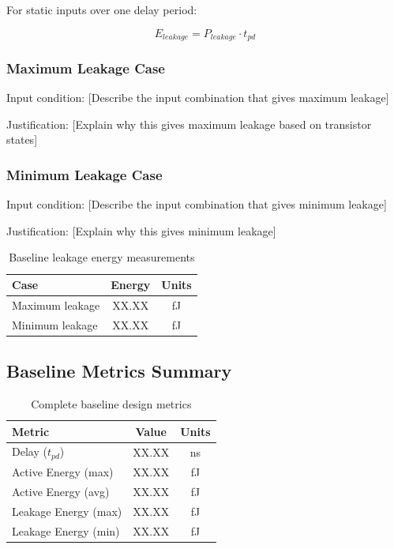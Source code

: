 \documentclass[12pt,letterpaper]{article}
\begin{document}
For static inputs over one delay period:

\begin{equation}
E_{leakage} = P_{leakage} \cdot t_{pd}
\end{equation}

\subsubsection{Maximum Leakage Case}

Input condition: [Describe the input combination that gives maximum leakage]

Justification: [Explain why this gives maximum leakage based on transistor states]

\subsubsection{Minimum Leakage Case}

Input condition: [Describe the input combination that gives minimum leakage]

Justification: [Explain why this gives minimum leakage]

\begin{table}[H]
\centering
\caption{Baseline leakage energy measurements}
\label{tab:baseline_leakage}
\begin{tabular}{@{}lcc@{}}
\toprule
\textbf{Case} & \textbf{Energy} & \textbf{Units} \\
\midrule
Maximum leakage & XX.XX & fJ \\
Minimum leakage & XX.XX & fJ \\
\bottomrule
\end{tabular}
\end{table}

\subsection{Baseline Metrics Summary}

\begin{table}[H]
\centering
\caption{Complete baseline design metrics}
\label{tab:baseline_summary}
\begin{tabular}{@{}lcc@{}}
\toprule
\textbf{Metric} & \textbf{Value} & \textbf{Units} \\
\midrule
Delay ($t_{pd}$) & XX.XX & ns \\
Active Energy (max) & XX.XX & fJ \\
Active Energy (avg) & XX.XX & fJ \\
Leakage Energy (max) & XX.XX & fJ \\
Leakage Energy (min) & XX.XX & fJ \\
\bottomrule
\end{tabular}
\end{table}
\end{document}
